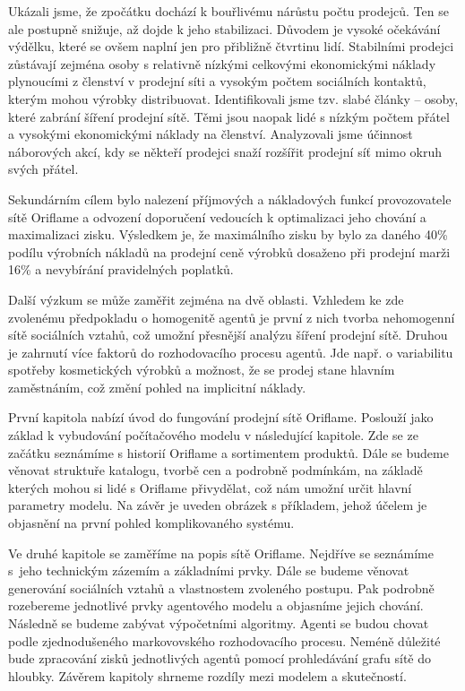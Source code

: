 \documentclass[a4paper,11pt]{report}
\begin{document}
Ukázali jsme, že zpočátku dochází k bouřlivému nárůstu počtu prodejců. Ten se ale postupně snižuje, až dojde k jeho stabilizaci. Důvodem je vysoké očekávání výdělku, které se ovšem naplní jen pro přibližně čtvrtinu lidí. Stabilními prodejci zůstávají zejména osoby s relativně nízkými celkovými ekonomickými náklady plynoucími z členství v prodejní síti a vysokým počtem sociálních kontaktů, kterým mohou výrobky distribuovat. Identifikovali jsme tzv. slabé články -- osoby, které zabrání šíření prodejní sítě. Těmi jsou naopak lidé s nízkým počtem přátel a vysokými ekonomickými náklady na členství. Analyzovali jsme účinnost náborových akcí, kdy se někteří prodejci snaží rozšířit prodejní síť mimo okruh svých přátel.

Sekundárním cílem bylo nalezení příjmových a nákladových funkcí provozovatele sítě Oriflame a odvození doporučení vedoucích k optimalizaci jeho chování a maximalizaci zisku. Výsledkem je, že maximálního zisku by bylo za daného 40\% podílu výrobních nákladů na prodejní ceně výrobků dosaženo při prodejní marži 16\% a nevybírání pravidelných poplatků.

Další výzkum se může zaměřit zejména na dvě oblasti. Vzhledem ke zde zvolenému předpokladu o homogenitě agentů je první z nich tvorba nehomogenní sítě sociálních vztahů, což umožní přesnější analýzu šíření prodejní sítě. Druhou je zahrnutí více faktorů do rozhodovacího procesu agentů. Jde např. o variabilitu spotřeby kosmetických výrobků a možnost, že se prodej stane hlavním zaměstnáním, což změní pohled na implicitní náklady.

První kapitola nabízí úvod do fungování prodejní sítě Oriflame. Poslouží jako základ k vybudování počítačového modelu v následující kapitole. Zde se ze začátku seznámíme s historií Oriflame a sortimentem produktů. Dále se budeme věnovat struktuře katalogu, tvorbě cen a podrobně podmínkám, na základě kterých mohou si lidé s Oriflame přivydělat, což nám umožní určit hlavní parametry modelu. Na závěr je uveden obrázek s příkladem, jehož účelem je objasnění na první pohled komplikovaného systému.

Ve druhé kapitole se zaměříme na popis sítě Oriflame. Nejdříve se seznámíme s~jeho technickým zázemím a základními prvky. Dále se budeme věnovat generování sociálních vztahů a vlastnostem zvoleného postupu. Pak podrobně rozebereme jednotlivé prvky agentového modelu a objasníme jejich chování. Následně se budeme zabývat výpočetními algoritmy. Agenti se budou chovat podle zjednodušeného markovovského rozhodovacího procesu. Neméně důležité bude zpracování zisků jednotlivých agentů pomocí prohledávání grafu sítě do hloubky. Závěrem kapitoly shrneme rozdíly mezi modelem a skutečností.
\end{document}
